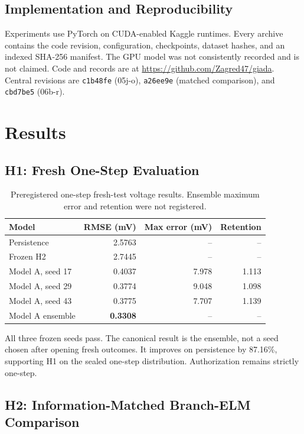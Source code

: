 \documentclass[11pt]{article}
\begin{document}
\subsection{Implementation and Reproducibility}

Experiments use PyTorch on CUDA-enabled Kaggle runtimes. Every archive contains
the code revision, configuration, checkpoints, dataset hashes, and an indexed
SHA-256 manifest. The GPU model was not consistently recorded and is not
claimed. Code and records are at \url{https://github.com/Zagred47/giada}.
Central revisions are \texttt{c1b48fe} (05j-o), \texttt{a26ee9e} (matched
comparison), and \texttt{cbd7be5} (06b-r).

\section{Results}

\subsection{H1: Fresh One-Step Evaluation}

\begin{table}[t]
\centering
\caption{Preregistered one-step fresh-test voltage results. Ensemble maximum
error and retention were not registered.}
\label{tab:fresh}
\small
\begin{tabular}{lrrr}
\toprule
Model & RMSE (mV) & Max error (mV) & Retention \\
\midrule
Persistence & 2.5763 & -- & -- \\
Frozen H2 & 2.7445 & -- & -- \\
Model A, seed 17 & 0.4037 & 7.978 & 1.113 \\
Model A, seed 29 & 0.3774 & 9.048 & 1.098 \\
Model A, seed 43 & 0.3775 & 7.707 & 1.139 \\
Model A ensemble & \textbf{0.3308} & -- & -- \\
\bottomrule
\end{tabular}
\end{table}

All three frozen seeds pass. The canonical result is the ensemble, not a seed
chosen after opening fresh outcomes. It improves on persistence by 87.16\%,
supporting H1 on the sealed one-step distribution. Authorization remains
strictly one-step.

\subsection{H2: Information-Matched Branch-ELM Comparison}
\end{document}
